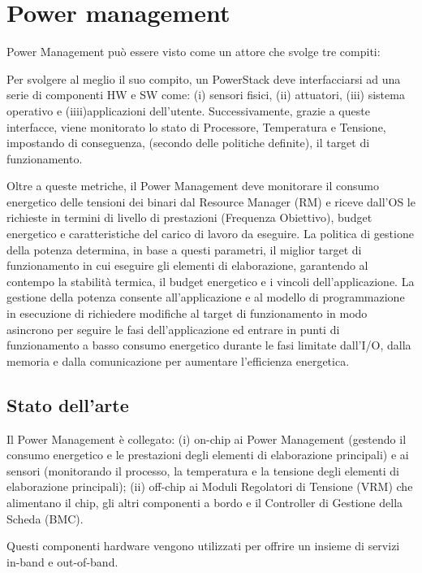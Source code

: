 \chapter{Power management}
Power Management può essere visto come un attore che svolge tre compiti:

Per svolgere al meglio il suo compito, un PowerStack deve interfacciarsi ad una serie di componenti HW e SW come: (i) sensori fisici, (ii) attuatori, (iii) sistema operativo e (iiii)applicazioni dell'utente. Successivamente, grazie a queste interfacce, viene monitorato lo stato di Processore, Temperatura e Tensione, impostando di conseguenza, (secondo delle politiche definite), il target di funzionamento. 

Oltre a queste metriche, il Power Management deve monitorare il consumo energetico delle tensioni dei binari dal Resource Manager (RM) e riceve dall'OS le richieste in termini di livello di prestazioni (Frequenza Obiettivo), budget energetico e caratteristiche del carico di lavoro da eseguire. La politica di gestione della potenza determina, in base a questi parametri, il miglior target di funzionamento in cui eseguire gli elementi di elaborazione, garantendo al contempo la stabilità termica, il budget energetico e i vincoli dell'applicazione. La gestione della potenza consente all'applicazione e al modello di programmazione in esecuzione di richiedere modifiche al target di funzionamento in modo asincrono per seguire le fasi dell'applicazione ed entrare in punti di funzionamento a basso consumo energetico durante le fasi limitate dall'I/O, dalla memoria e dalla comunicazione per aumentare l'efficienza energetica.


\section{Stato dell'arte}

Il Power Management è collegato: (i) on-chip ai Power Management (gestendo il consumo energetico e le prestazioni degli elementi di elaborazione principali) e ai sensori (monitorando il processo, la temperatura e la tensione degli elementi di elaborazione principali); (ii) off-chip ai Moduli Regolatori di Tensione (VRM) che alimentano il chip, gli altri componenti a bordo e il Controller di Gestione della Scheda (BMC).

Questi componenti hardware vengono utilizzati per offrire un insieme di servizi in-band e out-of-band.

